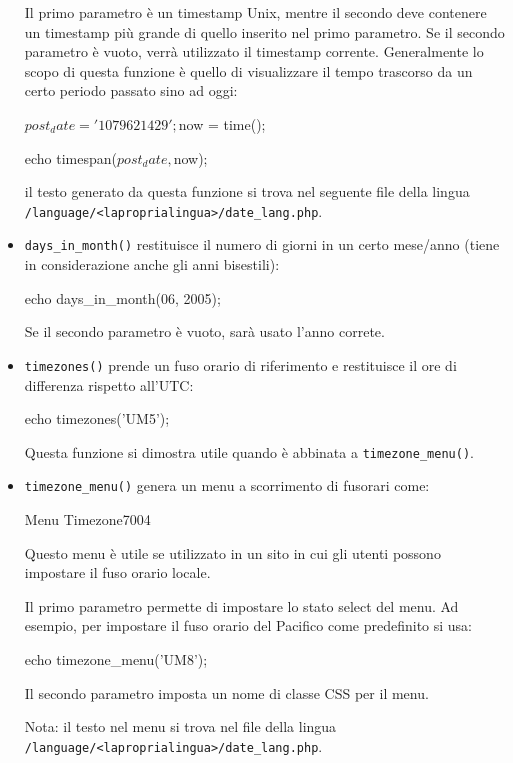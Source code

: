 \begin{itemize}
Il primo parametro è un timestamp Unix, mentre il secondo deve contenere un timestamp più grande di quello inserito nel primo parametro. Se il secondo parametro è vuoto, verrà utilizzato il timestamp corrente. Generalmente lo scopo di questa funzione è quello di visualizzare il tempo trascorso da un certo periodo passato sino ad oggi:

\begin{code}
$post_date = '1079621429';
$now = time();

echo timespan($post_date, $now);
\end{code}

il testo generato da questa funzione si trova nel seguente file della lingua \verb|/language/<laproprialingua>/date_lang.php|.

\item \verb|days_in_month()| restituisce il numero di giorni in un certo mese/anno (tiene in considerazione anche gli anni bisestili):

\begin{code}
echo days_in_month(06, 2005);
\end{code}

Se il secondo parametro è vuoto, sarà usato l'anno correte.

\item \verb|timezones()| prende un fuso orario di riferimento e restituisce il ore di differenza rispetto all'UTC:

\begin{code}
echo timezones('UM5');
\end{code}

Questa funzione si dimostra utile quando è abbinata a \verb|timezone_menu()|.

\item \verb|timezone_menu()| genera un menu a scorrimento di fusorari come:

\begin{img}{Menu Timezone}{7}{004}
\end{img}

Questo menu è utile se utilizzato in un sito in cui gli utenti possono impostare il fuso orario locale.

Il primo parametro permette di impostare lo stato select del menu. Ad esempio, per impostare il fuso orario del Pacifico come predefinito si usa:

\begin{code}
echo timezone_menu('UM8');
\end{code}

Il secondo parametro imposta un nome di classe \ac{CSS} per il menu.

Nota: il testo nel menu si trova nel file della lingua \verb|/language/<laproprialingua>/date_lang.php|.

\end{itemize}

